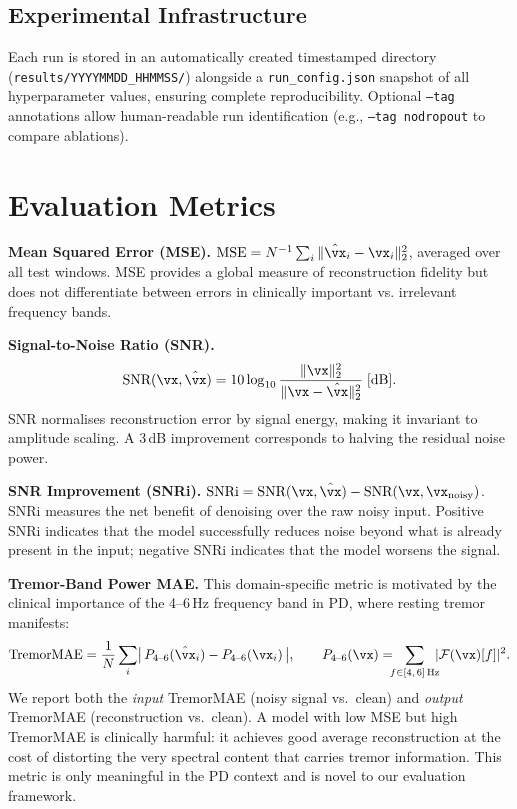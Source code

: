 \documentclass{article}
\newcommand{\tremorMAE}{\text{TremorMAE}}
\begin{document}
\subsection{Experimental Infrastructure}

Each run is stored in an automatically created timestamped directory
(\texttt{results/YYYYMMDD\_HHMMSS/}) alongside a \texttt{run\_config.json}
snapshot of all hyperparameter values, ensuring complete reproducibility.
Optional \texttt{--tag} annotations allow human-readable run identification
(e.g., \texttt{--tag nodropout} to compare ablations).

\section{Evaluation Metrics}
\label{sec:metrics}

\textbf{Mean Squared Error (MSE).}
$\text{MSE} = N^{-1}\sum_i \|\hat{\vx}_i - \vx_i\|_2^2$, averaged over all
test windows.
MSE provides a global measure of reconstruction fidelity but does not
differentiate between errors in clinically important vs. irrelevant frequency
bands.

\textbf{Signal-to-Noise Ratio (SNR).}
%
\begin{equation}
  \text{SNR}(\vx, \hat{\vx}) = 10\log_{10}
    \frac{\|\vx\|_2^2}{\|\vx - \hat{\vx}\|_2^2}\;[\text{dB}].
\end{equation}
%
SNR normalises reconstruction error by signal energy, making it invariant to
amplitude scaling.
A 3\,dB improvement corresponds to halving the residual noise power.

\textbf{SNR Improvement (SNRi).}
$\text{SNRi} = \text{SNR}(\vx, \hat{\vx}) - \text{SNR}(\vx, \vx_{\text{noisy}})$.
SNRi measures the net benefit of denoising over the raw noisy input.
Positive SNRi indicates that the model successfully reduces noise beyond what is
already present in the input; negative SNRi indicates that the model worsens
the signal.

\textbf{Tremor-Band Power MAE.}
This domain-specific metric is motivated by the clinical importance of the
4--6\,Hz frequency band in PD, where resting tremor manifests:
%
\begin{equation}
  \tremorMAE = \frac{1}{N}\sum_i
    \bigl|\,P_{4\text{--}6}(\hat{\vx}_i) - P_{4\text{--}6}(\vx_i)\,\bigr|,
  \qquad
  P_{4\text{--}6}(\vx) = \!\!\!\sum_{f \in [4,\,6]\,\text{Hz}}\!\!\! |\mathcal{F}(\vx)[f]|^2.
\end{equation}
%
We report both the \emph{input} TremorMAE (noisy signal vs.\ clean) and
\emph{output} TremorMAE (reconstruction vs.\ clean).
A model with low MSE but high TremorMAE is clinically harmful: it achieves
good average reconstruction at the cost of distorting the very spectral
content that carries tremor information.
This metric is only meaningful in the PD context and is novel to our
evaluation framework.
\end{document}
